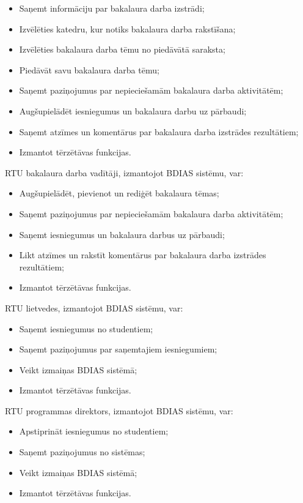 \begin{itemize}[noitemsep, nolistsep]
    \item Saņemt informāciju par bakalaura darba izstrādi;
    \item Izvēlēties katedru, kur notiks bakalaura darba rakstīšana;
    \item Izvēlēties bakalaura darba tēmu no piedāvātā saraksta;
    \item Piedāvāt savu bakalaura darba tēmu;
    \item Saņemt paziņojumus par nepieciešamām bakalaura darba aktivitātēm;
    \item Augšupielādēt iesniegumus un bakalaura darbu uz pārbaudi;
    \item Saņemt atzīmes un komentārus par bakalaura darba izstrādes rezultātiem;
    \item Izmantot tērzētāvas funkcijas.
\end{itemize}

RTU bakalaura darba vadītāji, izmantojot BDIAS sistēmu, var:

\begin{itemize}[noitemsep, nolistsep]
    \item Augšupielādēt, pievienot un rediģēt bakalaura tēmas;
    \item Saņemt paziņojumus par nepieciešamām bakalaura darba aktivitātēm;
    \item Saņemt iesniegumus un bakalaura darbus uz pārbaudi;
    \item Likt atzīmes un rakstīt komentārus par bakalaura darba izstrādes rezultātiem;
    \item Izmantot tērzētāvas funkcijas.
\end{itemize}

RTU lietvedes, izmantojot BDIAS sistēmu, var:

\begin{itemize}[noitemsep, nolistsep]
    \item Saņemt iesniegumus no studentiem;
    \item Saņemt paziņojumus par saņemtajiem iesniegumiem;
    \item Veikt izmaiņas BDIAS sistēmā;
    \item Izmantot tērzētāvas funkcijas.
\end{itemize}

RTU programmas direktors, izmantojot BDIAS sistēmu, var:

\begin{itemize}[noitemsep, nolistsep]
    \item Apstiprināt iesniegumus no studentiem;
    \item Saņemt paziņojumus no sistēmas;
    \item Veikt izmaiņas BDIAS sistēmā;
    \item Izmantot tērzētāvas funkcijas.
\end{itemize}

